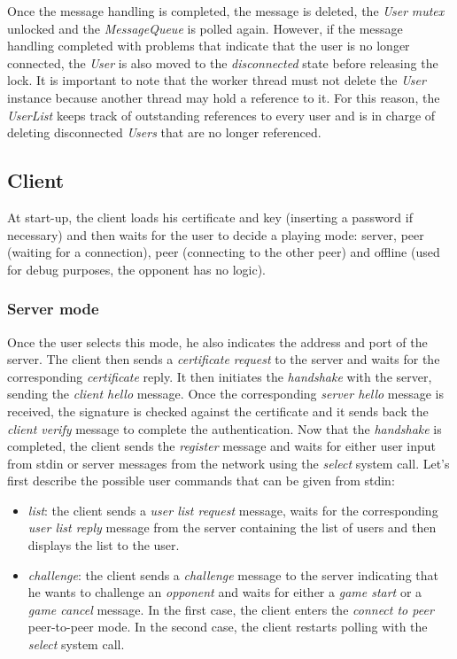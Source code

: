 Once the message handling is completed, the message is deleted, the \emph{User} 
\emph{mutex} unlocked and the \emph{MessageQueue} is polled again. 
However, if the message handling completed with problems that indicate that 
the user is no longer connected, the \emph{User} is also moved to the 
\emph{disconnected} state before releasing the lock. It is important to note 
that the worker thread must not delete the \emph{User} instance because another
thread may hold a reference to it. For this reason, the \emph{UserList} keeps
track of outstanding references to every user and is in charge of deleting 
disconnected \emph{Users} that are no longer referenced.

\subsection{Client}
At start-up, the client loads his certificate and key (inserting a password if 
necessary) and then waits for the user to decide a playing mode: server, 
peer (waiting for a connection), peer (connecting to the other peer) and 
offline (used for debug purposes, the opponent has no logic).

\subsubsection{Server mode}
Once the user selects this mode, he also indicates the address and port of the 
server. The client then sends a \emph{certificate request} to the server and 
waits for the corresponding \emph{certificate} reply. It then initiates the 
\emph{handshake} with the server, sending the \emph{client hello} message. Once 
the corresponding \emph{server hello} message is received, the signature is 
checked against the certificate and it sends back the \emph{client verify} 
message to complete the authentication. Now that the \emph{handshake} is 
completed, the client sends the \emph{register} message and waits for either 
user input from stdin or server messages from the network using the 
\emph{select} system call. Let's first describe the possible user commands that 
can be given from stdin:
\begin{itemize}
    \item \emph{list}: the client sends a \emph{user list request} message,
        waits for the corresponding \emph{user list reply} message from 
        the server containing the list of users and then displays the list 
        to the user.
    \item \emph{challenge}: the client sends a \emph{challenge} message 
        to the server indicating that he wants to challenge an \emph{opponent}
        and waits for either a \emph{game start} or a \emph{game cancel} 
        message. In the first case, the client enters the \emph{connect to 
        peer} peer-to-peer mode. In the second case, the client restarts polling
        with the \emph{select} system call.
\end{itemize}

